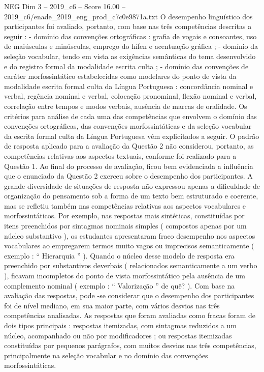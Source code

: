 \begin{textsample}{NEG Dim 3 – 2019\_c6 – Score 16.00 – 2019\_c6/enade\_2019\_eng\_prod\_c7c0e9871a.txt}
O desempenho linguístico dos participantes foi avaliado, portanto, com base nas três competências descritas a seguir : - domínio das convenções ortográficas : grafia de vogais e consoantes, uso de maiúsculas e minúsculas, emprego do hífen e acentuação gráfica ; - domínio da seleção vocabular, tendo em vista as exigências semânticas do tema desenvolvido e do registro formal da modalidade escrita culta ; - domínio das convenções de caráter morfossintático estabelecidas como modelares do ponto de vista da modalidade escrita formal culta da Língua Portuguesa : concordância nominal e verbal, regência nominal e verbal, colocação pronominal, flexão nominal e verbal, correlação entre tempos e modos verbais, ausência de marcas de oralidade.
Os critérios para análise de cada uma das competências que envolvem o domínio das convenções ortográficas, das convenções morfossintáticas e da seleção vocabular da escrita formal culta da Língua Portuguesa vêm explicitados a seguir.
O padrão de resposta aplicado para a avaliação da Questão 2 não considerou, portanto, as competências relativas aos aspectos textuais, conforme foi realizado para a Questão 1.
Ao final do processo de avaliação, ficou bem evidenciada a influência que o enunciado da Questão 2 exerceu sobre o desempenho dos participantes.
A grande diversidade de situações de resposta não expressou apenas a dificuldade de organização do pensamento sob a forma de um texto bem estruturado e coerente, mas se refletiu também nas competências relativas aos aspectos vocabulares e morfossintáticos.
Por exemplo, nas respostas mais sintéticas, constituídas por itens preenchidos por sintagmas nominais simples ( compostos apenas por um núcleo substantivo ), os estudantes apresentaram fraco desempenho nos aspectos vocabulares ao empregarem termos muito vagos ou imprecisos semanticamente ( exemplo : “ Hierarquia ” ).
Quando o núcleo desse modelo de resposta era preenchido por substantivos deverbais ( relacionados semanticamente a um verbo ), ficavam incompletos do ponto de vista morfossintático pela ausência de um complemento nominal ( exemplo : “ Valorização ” de quê? ).
Com base na avaliação das respostas, pode -se considerar que o desempenho dos participantes foi de nível mediano, em sua maior parte, com vários desvios nas três competências analisadas.
As respostas que foram avaliadas como fracas foram de dois tipos principais : respostas itemizadas, com sintagmas reduzidos a um núcleo, acompanhado ou não por modificadores ; ou respostas itemizadas constituídas por pequenos parágrafos, com muitos desvios nas três competências, principalmente na seleção vocabular e no domínio das convenções morfossintáticas.

\end{textsample}
